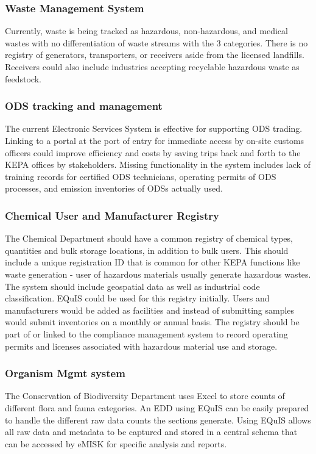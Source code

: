 \subsubsection{Waste Management System}
Currently, waste is being tracked as hazardous, non-hazardous, and medical wastes with no differentiation of waste streams with the 3 categories. There is no registry of generators, transporters, or receivers aside from the licensed landfills. Receivers could also include industries accepting recyclable hazardous waste as feedstock.

\subsubsection{ODS tracking and management}
The current Electronic Services System is effective for supporting ODS trading. Linking to a portal at the port of entry for immediate access by on-site customs officers could improve efficiency and costs by saving trips back and forth to the KEPA offices by stakeholders. Missing functionality in the system includes lack of training records for certified ODS technicians, operating permits of ODS processes, and emission inventories of ODSs actually used.

\subsubsection{Chemical User  and Manufacturer Registry}
The Chemical Department should have a common registry of chemical types, quantities and bulk storage locations, in addition to bulk users. This should include a unique registration ID that is common for other KEPA functions like waste generation - user of hazardous materials usually generate hazardous wastes. The system should include geospatial data as well as industrial code classification. EQuIS could be used for this registry initially. Users and manufacturers would be added as facilities and instead of submitting samples would submit inventories on a monthly or annual basis. The registry should be part of or linked to the compliance management system to record operating permits and licenses associated with hazardous material use and storage.

\subsubsection{Organism Mgmt system}
The Conservation of Biodiversity Department uses Excel to store counts of different flora and fauna categories. An EDD using EQuIS can be easily prepared to handle the different raw data counts the sections generate. Using EQuIS allows all raw data and metadata to be captured and stored in a central schema that can be accessed by eMISK for specific analysis and reports.

